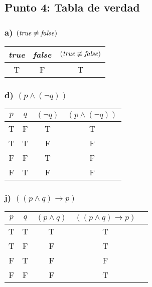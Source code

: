 \documentclass{article}
\begin{document}
\subsection{Punto 4: Tabla de verdad}
\subsubsection{a) $(\textrm{\textit{true}} \not\equiv \textrm{\textit{false}})$}
\begin{center}
    \begin{NiceTabular}{|c|c|c|}
        \hline
        \textit{true} & \textit{false} & $(\textrm{\textit{true}} \not\equiv \textrm{\textit{false}})$ \\
        \hline
        \ttfamily T   & \ttfamily F    & \ttfamily T                                                   \\
        \hline
    \end{NiceTabular}
\end{center}
\subsubsection{d) $(p \wedge (\lnot q))$}
\begin{center}
    \begin{NiceTabular}{|c|c|c|c|}
        \hline
        $p$         & $q$         & $(\lnot q)$ & $(p \wedge (\lnot q))$ \\
        \hline
        \ttfamily T & \ttfamily F & \ttfamily T & \ttfamily T            \\
        \ttfamily T & \ttfamily T & \ttfamily F & \ttfamily F            \\
        \ttfamily F & \ttfamily F & \ttfamily T & \ttfamily F            \\
        \ttfamily F & \ttfamily T & \ttfamily F & \ttfamily F            \\
        \hline
    \end{NiceTabular}
\end{center}
\subsubsection{j) $((p \wedge q) \to p)$}
\begin{center}
    \begin{NiceTabular}{|c|c|c|c|c|}
        \hline
        $p$         & $q$         & $(p \wedge q)$ & $((p \wedge q) \to p)$ \\
        \hline
        \ttfamily T & \ttfamily T & \ttfamily T    & \ttfamily T            \\
        \ttfamily T & \ttfamily F & \ttfamily F    & \ttfamily T            \\
        \ttfamily F & \ttfamily T & \ttfamily F    & \ttfamily F            \\
        \ttfamily F & \ttfamily F & \ttfamily F    & \ttfamily T            \\
        \hline
    \end{NiceTabular}
\end{center}
\end{document}

